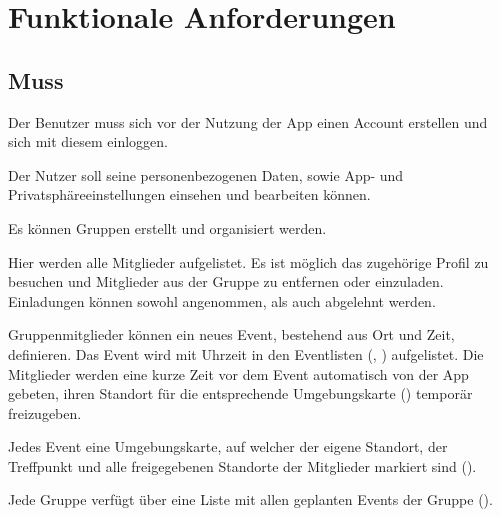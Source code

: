 \documentclass[parskip=full,11pt]{scrartcl}
\begin{document}

\section{Funktionale Anforderungen}

\subsection{Muss}

Der Benutzer muss sich vor der Nutzung der App einen Account erstellen und sich mit diesem
einloggen.

Der Nutzer soll seine personenbezogenen Daten,
sowie App- und Privatsphäreeinstellungen einsehen und bearbeiten können.


Es können Gruppen erstellt und organisiert werden.

Hier werden alle Mitglieder aufgelistet.
Es ist möglich das zugehörige Profil zu besuchen und Mitglieder aus der Gruppe zu entfernen oder einzuladen.
Einladungen können sowohl angenommen, als auch abgelehnt werden.

Gruppenmitglieder können ein neues Event, bestehend aus Ort und Zeit, definieren.
Das Event wird mit Uhrzeit in den Eventlisten (, ) aufgelistet.
Die Mitglieder werden eine kurze Zeit vor dem Event automatisch von der App gebeten,
ihren Standort für die entsprechende Umgebungskarte () temporär freizugeben.

Jedes Event eine Umgebungskarte, auf welcher der eigene Standort,
der Treffpunkt und alle freigegebenen Standorte der Mitglieder markiert sind ().

Jede Gruppe verfügt über eine Liste mit allen geplanten Events der Gruppe ().
\end{document}
